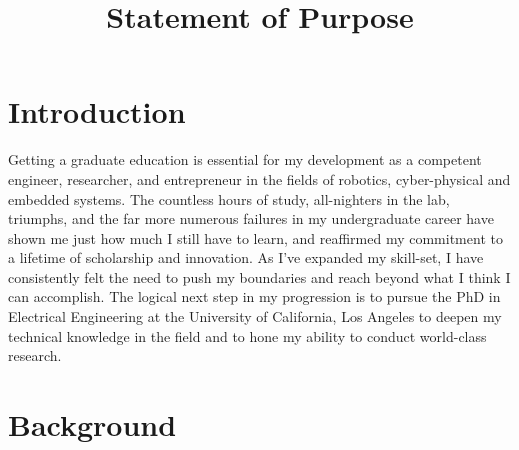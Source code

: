 \documentclass[journal, draftcls]{IEEEtran}
\begin{document}
%
\title{Statement of Purpose}
\author{
}
\maketitle
\section{Introduction}

Getting a graduate education is essential for my development as a competent engineer, researcher, and entrepreneur in the fields of robotics, cyber-physical and embedded systems. The countless hours of study, all-nighters in the lab, triumphs, and the far more numerous failures in my undergraduate career have shown me just how much I still have to learn, and reaffirmed my commitment to a lifetime of scholarship and innovation. As I've expanded my skill-set, I have consistently felt the need to push my  boundaries and reach beyond what I think I can accomplish. The logical next step in my progression is to pursue the PhD in Electrical Engineering at the University of California, Los Angeles to deepen my technical knowledge in the field and to hone my ability to conduct world-class research.

\section{Background}
\end{document}
